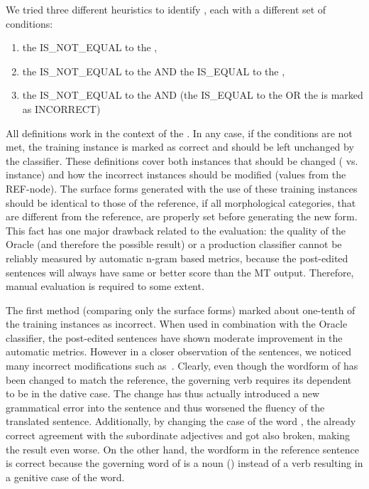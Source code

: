 We tried three different heuristics to identify , each with a different set of conditions:
\begin{enumerate}
    \item the  IS\_NOT\_EQUAL to the ,
    \item the  IS\_NOT\_EQUAL to the  AND the  IS\_EQUAL to the ,
    \item the  IS\_NOT\_EQUAL to the  AND (the  IS\_EQUAL to the 
        OR the  is marked as INCORRECT)
\end{enumerate}
All definitions work in the context of the . In any case, if the conditions
are not met, the training instance is marked as correct and should be left unchanged by the classifier.
These definitions cover both instances that should be changed ( vs.  instance)
and how the incorrect instances should be modified (values from the REF-node). The surface forms
generated with the use of these training instances should be identical to those of the reference,
if all morphological categories, that are different from the reference, are properly set before generating the new form.
This fact has one major drawback related to the evaluation:
the quality of the Oracle (and therefore the 
possible result) or a production classifier cannot be reliably measured by automatic n-gram based metrics, because the post-edited
sentences will always have same or better score than the MT output. Therefore, manual evaluation is required
to some extent.

The first method (comparing only the surface forms) marked about one-tenth of the training instances as incorrect. When used in combination
with the Oracle classifier, the post-edited sentences have shown moderate improvement in the automatic metrics.
However in a closer observation of the sentences, we noticed many incorrect modifications such as~.
Clearly, even though the wordform of  has been changed to match the reference,
the governing verb  requires its dependent to be in the dative case. The change
has thus actually introduced a new grammatical error into the sentence and thus worsened
the fluency of the translated sentence. Additionally, by changing 
the case of the word , the already correct agreement with the subordinate adjectives
 and  got also broken, making the result even worse. On the other hand,
the wordform in the reference sentence is correct because the governing word of 
is a noun () instead of a verb resulting in a genitive case of the word.

